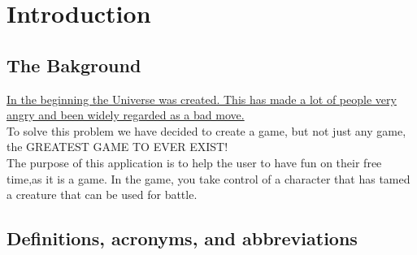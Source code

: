 \section{Introduction}

\begin{comment}
Give some background and explain the purpose of this application. Describe
the functionality of the application. Describe the stakeholders of the project,
highlight who will benefit from/use this particular application.
\end{comment}
\subsection{The Bakground}
\href{https://www.amazon.com/Restaurant-at-End-Universe/dp/0345391810}{
	In the beginning the Universe was created. This has made a lot of people very angry and been widely regarded as a bad move.}\\
To solve this problem we have decided to create a game, but not just any game, the GREATEST GAME TO EVER EXIST!\\

The purpose of this application is to help the user to have fun on their free time,as it is a game. In the game, you take control of a character that has tamed a creature that can be used for battle.


\subsection{Definitions, acronyms, and abbreviations}
\begin{comment}
Create a word list to avoid confusion and give a definition of every abbreviation
you use in the document.
\end{comment}
